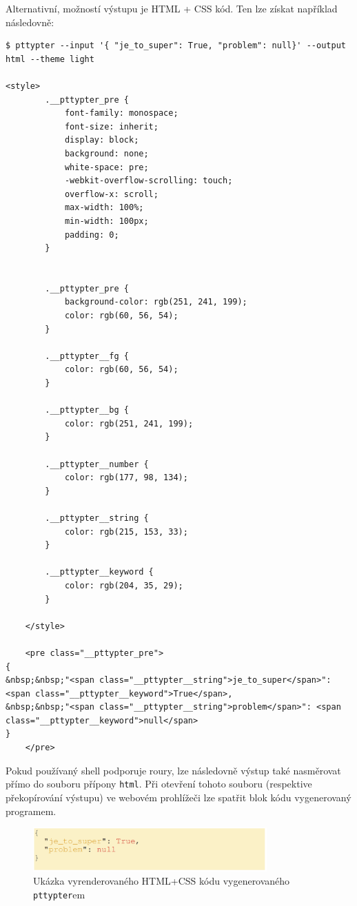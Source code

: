 \documentclass[11pt, letterpaper]{article}
\begin{document}
Alternativní, možností výstupu je HTML + CSS kód. Ten lze získat například následovně:
\begin{lstlisting}
$ pttypter --input '{ "je_to_super": True, "problem": null}' --output html --theme light

<style>
		.__pttypter_pre {
			font-family: monospace;
			font-size: inherit;
			display: block;
			background: none;
			white-space: pre;
			-webkit-overflow-scrolling: touch;
			overflow-x: scroll;
			max-width: 100%;
			min-width: 100px;
			padding: 0;
		}

		
		.__pttypter_pre {
			background-color: rgb(251, 241, 199);
			color: rgb(60, 56, 54);
		}

		.__pttypter__fg {
			color: rgb(60, 56, 54);
		}

		.__pttypter__bg {
			color: rgb(251, 241, 199);
		}

		.__pttypter__number {
			color: rgb(177, 98, 134);
		}

		.__pttypter__string {
			color: rgb(215, 153, 33);
		}

		.__pttypter__keyword {
			color: rgb(204, 35, 29);
		}
	
	</style>

	<pre class="__pttypter_pre">
{
&nbsp;&nbsp;"<span class="__pttypter__string">je_to_super</span>": <span class="__pttypter__keyword">True</span>,
&nbsp;&nbsp;"<span class="__pttypter__string">problem</span>": <span class="__pttypter__keyword">null</span>
}
	</pre>

\end{lstlisting}

Pokud používaný shell podporuje roury, lze následovně výstup také nasměrovat přímo do souboru přípony \texttt{html}. Při otevření tohoto souboru (respektive překopírování výstupu) ve webovém prohlížeči lze spatřit blok kódu vygenerovaný programem.

\begin{figure}[H]
    \begin{center}
        \includegraphics[width=0.8\textwidth]{web1}
    \end{center}
    \caption{Ukázka vyrenderovaného HTML+CSS kódu vygenerovaného \texttt{pttypter}em}
\end{figure}
\end{document}
